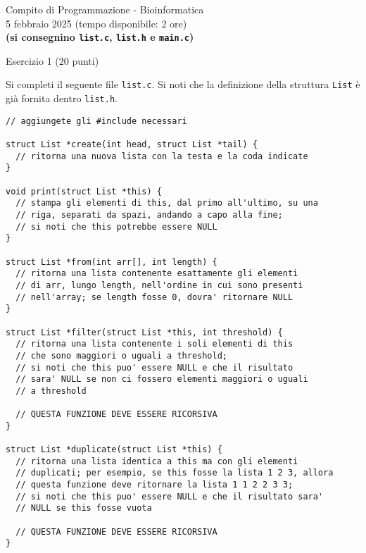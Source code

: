 \documentclass[12pt]{article}
\begin{document}
\begin{center}{\LARGE Compito di Programmazione - Bioinformatica}\\
  \large 5 febbraio 2025 (tempo disponibile: 2 ore)\\
  \textbf{(si consegnino \texttt{list.c}, \texttt{list.h} e \texttt{main.c})}
\end{center}

\vspace*{1ex}
\begin{center}{\Large Esercizio 1} ($20$ punti)
\end{center}

Si completi il seguente file \texttt{list.c}. Si noti che la definizione della
struttura \texttt{List} \`e gi\`a fornita dentro \texttt{list.h}.

\begin{center}
\begin{lstlisting}[language=myC]
// aggiungete gli #include necessari

struct List *create(int head, struct List *tail) {
  // ritorna una nuova lista con la testa e la coda indicate
}

void print(struct List *this) {
  // stampa gli elementi di this, dal primo all'ultimo, su una
  // riga, separati da spazi, andando a capo alla fine;
  // si noti che this potrebbe essere NULL
}

struct List *from(int arr[], int length) {
  // ritorna una lista contenente esattamente gli elementi
  // di arr, lungo length, nell'ordine in cui sono presenti
  // nell'array; se length fosse 0, dovra' ritornare NULL
}

struct List *filter(struct List *this, int threshold) {
  // ritorna una lista contenente i soli elementi di this
  // che sono maggiori o uguali a threshold;
  // si noti che this puo' essere NULL e che il risultato
  // sara' NULL se non ci fossero elementi maggiori o uguali
  // a threshold
  
  // QUESTA FUNZIONE DEVE ESSERE RICORSIVA
}

struct List *duplicate(struct List *this) {
  // ritorna una lista identica a this ma con gli elementi
  // duplicati; per esempio, se this fosse la lista 1 2 3, allora
  // questa funzione deve ritornare la lista 1 1 2 2 3 3;
  // si noti che this puo' essere NULL e che il risultato sara'
  // NULL se this fosse vuota

  // QUESTA FUNZIONE DEVE ESSERE RICORSIVA
}
\end{lstlisting}
\end{center}
\end{document}
